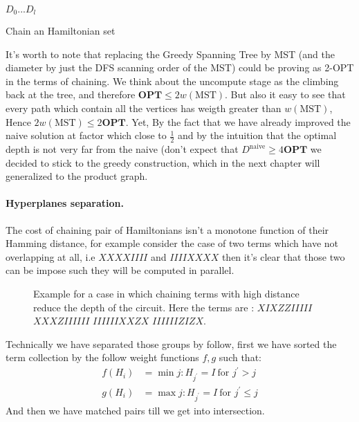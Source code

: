 \documentclass{article}
\begin{document}
\begin{multicols*}{2}
\begin{algorithm}[H]
\SetAlgoLined
\ \\ 
\Return \(D_{0} ... D_{l}\) 
 \caption{Chain an Hamiltonian set }
\end{algorithm}
It's worth to note that replacing the Greedy Spanning Tree by MST (and the diameter by just the DFS scanning order of the MST) could be proving as 2-OPT in the terms of chaining. We think about the uncompute stage as the climbing back at the tree, and therefore \( \textbf{OPT} \le 2w\left(\text{MST} \right) \). But also it easy to see that every path which contain all the vertices has weigth greater than \(w\left(\text{MST} \right) \), Hence  \(2w\left(\text{MST} \right) \le 2\textbf{OPT}\).          
Yet, By the fact that we have already improved the naive solution at factor which close to \(\frac{1}{2}\) and by the intuition that the optimal depth is not very far from the naive (don't expect that \( D^{\text{naive}} \ge 4 \textbf{OPT} \) we decided to stick to the greedy construction, which in the next chapter will generalized to the product graph. 

\paragraph{Hyperplanes separation.} The cost of chaining pair of Hamiltonians isn't  a monotone function of their Hamming distance, for example consider the case of two terms which have not overlapping at all, i.e \( XXXXIIII \) and \(IIIIXXXX \) then it's clear that those two can be impose such they will be computed in parallel.   


\begin{figure}[H]
  \centering
    
    \caption{ Example for a case in which chaining terms with high distance reduce the depth of the circuit. Here the terms are : \(XIXZZIIIII \) \( XXXZIIIIII \) \( IIIIIIXXZX\) \( IIIIIIZIZX \). }
    \label{fig:average-data-vs-model}
\end{figure}

Technically we have separated those groups by follow, first we have sorted the term collection by the follow weight functions \(f,g\) such that:
\begin{equation*}
    \begin{split}
        f\left(H_{i}\right) &= \min {j : H_{j^{\prime}} = I \ \text{for } j^{\prime} > j } \\
        g\left(H_{i}\right) &= \max {j : H_{j^{\prime}} = I \ \text{for } j^{\prime} \le j }
    \end{split}
\end{equation*}    
And then we have matched pairs till we get into intersection.  

\end{multicols*}
\end{document}
